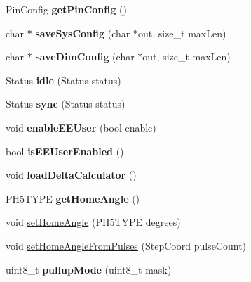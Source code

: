 \begin{DoxyCompactItemize}
\item 
\hypertarget{classfirestep_1_1_machine_a773c07a6e2d06a51d836b996c6c45a5a}{Pin\+Config {\bfseries get\+Pin\+Config} ()}\label{classfirestep_1_1_machine_a773c07a6e2d06a51d836b996c6c45a5a}

\item 
\hypertarget{classfirestep_1_1_machine_a44d29a2c0cd0c9469d3eb4d4d7ea1cd9}{char $\ast$ {\bfseries save\+Sys\+Config} (char $\ast$out, size\+\_\+t max\+Len)}\label{classfirestep_1_1_machine_a44d29a2c0cd0c9469d3eb4d4d7ea1cd9}

\item 
\hypertarget{classfirestep_1_1_machine_a07825c242d26746ac674ec433ee1461a}{char $\ast$ {\bfseries save\+Dim\+Config} (char $\ast$out, size\+\_\+t max\+Len)}\label{classfirestep_1_1_machine_a07825c242d26746ac674ec433ee1461a}

\item 
\hypertarget{classfirestep_1_1_machine_afdb1abb94c1d775d317b83aefc355f37}{Status {\bfseries idle} (Status status)}\label{classfirestep_1_1_machine_afdb1abb94c1d775d317b83aefc355f37}

\item 
\hypertarget{classfirestep_1_1_machine_a5c6d3c34db64ebbb576522e37ea2703e}{Status {\bfseries sync} (Status status)}\label{classfirestep_1_1_machine_a5c6d3c34db64ebbb576522e37ea2703e}

\item 
\hypertarget{classfirestep_1_1_machine_a8d98e99157176991d51f752913ccb448}{void {\bfseries enable\+E\+E\+User} (bool enable)}\label{classfirestep_1_1_machine_a8d98e99157176991d51f752913ccb448}

\item 
\hypertarget{classfirestep_1_1_machine_a5a7088ff22ea433073b82551523dae3d}{bool {\bfseries is\+E\+E\+User\+Enabled} ()}\label{classfirestep_1_1_machine_a5a7088ff22ea433073b82551523dae3d}

\item 
\hypertarget{classfirestep_1_1_machine_affe2e3dbc49b0c0d970258694ecadf1a}{void {\bfseries load\+Delta\+Calculator} ()}\label{classfirestep_1_1_machine_affe2e3dbc49b0c0d970258694ecadf1a}

\item 
\hypertarget{classfirestep_1_1_machine_a34117b40d793c078f3daca80203142a2}{P\+H5\+T\+Y\+P\+E {\bfseries get\+Home\+Angle} ()}\label{classfirestep_1_1_machine_a34117b40d793c078f3daca80203142a2}

\item 
void \hyperlink{classfirestep_1_1_machine_a93b092c0652cb3abbe52169d41063462}{set\+Home\+Angle} (P\+H5\+T\+Y\+P\+E degrees)
\item 
void \hyperlink{classfirestep_1_1_machine_a85fbaf148788ffbdfe297d50a916238e}{set\+Home\+Angle\+From\+Pulses} (Step\+Coord pulse\+Count)
\item 
\hypertarget{classfirestep_1_1_machine_a094267b4480a43f65a66683bc510e5e7}{uint8\+\_\+t {\bfseries pullup\+Mode} (uint8\+\_\+t mask)}\label{classfirestep_1_1_machine_a094267b4480a43f65a66683bc510e5e7}

\end{DoxyCompactItemize}

